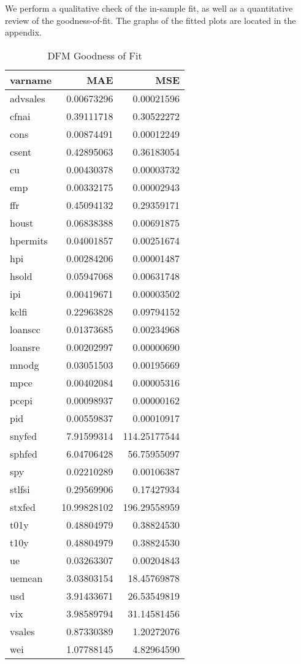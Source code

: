 \documentclass[11pt, letterpaper]{article}\usepackage[]{graphicx}\usepackage[]{color}
\begin{document}
We perform a qualitative check of the in-sample fit, as well as a quantitative review of the goodness-of-fit. The graphs of the fitted plots are located in the appendix.
\begin{table}[H]
\centering
\begingroup\footnotesize
\begin{tabular}{lrr}
  \hline
varname & MAE & MSE \\ 
  \hline
advsales & 0.00673296 & 0.00021596 \\ 
  cfnai & 0.39111718 & 0.30522272 \\ 
  cons & 0.00874491 & 0.00012249 \\ 
  csent & 0.42895063 & 0.36183054 \\ 
  cu & 0.00430378 & 0.00003732 \\ 
  emp & 0.00332175 & 0.00002943 \\ 
  ffr & 0.45094132 & 0.29359171 \\ 
  houst & 0.06838388 & 0.00691875 \\ 
  hpermits & 0.04001857 & 0.00251674 \\ 
  hpi & 0.00284206 & 0.00001487 \\ 
  hsold & 0.05947068 & 0.00631748 \\ 
  ipi & 0.00419671 & 0.00003502 \\ 
  kclfi & 0.22963828 & 0.09794152 \\ 
  loanscc & 0.01373685 & 0.00234968 \\ 
  loansre & 0.00202997 & 0.00000690 \\ 
  mnodg & 0.03051503 & 0.00195669 \\ 
  mpce & 0.00402084 & 0.00005316 \\ 
  pcepi & 0.00098937 & 0.00000162 \\ 
  pid & 0.00559837 & 0.00010917 \\ 
  snyfed & 7.91599314 & 114.25177544 \\ 
  sphfed & 6.04706428 & 56.75955097 \\ 
  spy & 0.02210289 & 0.00106387 \\ 
  stlfsi & 0.29569906 & 0.17427934 \\ 
  stxfed & 10.99828102 & 196.29558959 \\ 
  t01y & 0.48804979 & 0.38824530 \\ 
  t10y & 0.48804979 & 0.38824530 \\ 
  ue & 0.03263307 & 0.00204843 \\ 
  uemean & 3.03803154 & 18.45769878 \\ 
  usd & 3.91433671 & 26.53549819 \\ 
  vix & 3.98589794 & 31.14581456 \\ 
  vsales & 0.87330389 & 1.20272076 \\ 
  wei & 1.07788145 & 4.82964590 \\ 
   \hline
\end{tabular}
\endgroup
\caption{DFM Goodness of Fit} 
\end{table}
\end{document}
